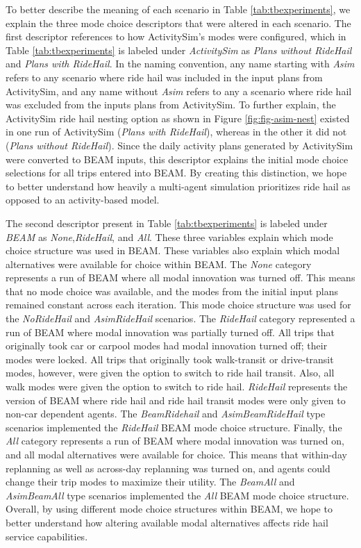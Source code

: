 \documentclass[12pt, oneside, openright]{byuthesis}
\begin{document}
To better describe the meaning of each scenario in Table \ref{tab:tbexperiments}, we explain the three mode choice descriptors that were altered in each scenario. The first descriptor references to how ActivitySim's modes were configured, which in Table \ref{tab:tbexperiments} is labeled under \emph{ActivitySim} as \emph{Plans without RideHail} and \emph{Plans with RideHail}. In the naming convention, any name starting with \emph{Asim} refers to any scenario where ride hail was included in the input plans from ActivitySim, and any name without \emph{Asim} refers to any a scenario where ride hail was excluded from the inputs plans from ActivitySim. To further explain, the ActivitySim ride hail nesting option as shown in Figure \ref{fig:fig-asim-nest} existed in one run of ActivitySim (\emph{Plans with RideHail}), whereas in the other it did not (\emph{Plans without RideHail}). Since the daily activity plans generated by ActivitySim were converted to BEAM inputs, this descriptor explains the initial mode choice selections for all trips entered into BEAM. By creating this distinction, we hope to better understand how heavily a multi-agent simulation prioritizes ride hail as opposed to an activity-based model.

The second descriptor present in Table \ref{tab:tbexperiments} is labeled under \emph{BEAM} as \emph{None},\emph{RideHail}, and \emph{All}. These three variables explain which mode choice structure was used in BEAM. These variables also explain which modal alternatives were available for choice within BEAM. The \emph{None} category represents a run of BEAM where all modal innovation was turned off. This means that no mode choice was available, and the modes from the initial input plans remained constant across each iteration. This mode choice structure was used for the \emph{NoRideHail} and \emph{AsimRideHail} scenarios. The \emph{RideHail} category represented a run of BEAM where modal innovation was partially turned off. All trips that originally took car or carpool modes had modal innovation turned off; their modes were locked. All trips that originally took walk-transit or drive-transit modes, however, were given the option to switch to ride hail transit. Also, all walk modes were given the option to switch to ride hail. \emph{RideHail} represents the version of BEAM where ride hail and ride hail transit modes were only given to non-car dependent agents. The \emph{BeamRidehail} and \emph{AsimBeamRideHail} type scenarios implemented the \emph{RideHail} BEAM mode choice structure. Finally, the \emph{All} category represents a run of BEAM where modal innovation was turned on, and all modal alternatives were available for choice. This means that within-day replanning as well as across-day replanning was turned on, and agents could change their trip modes to maximize their utility. The \emph{BeamAll} and \emph{AsimBeamAll} type scenarios implemented the \emph{All} BEAM mode choice structure. Overall, by using different mode choice structures within BEAM, we hope to better understand how altering available modal alternatives affects ride hail service capabilities.
\end{document}
